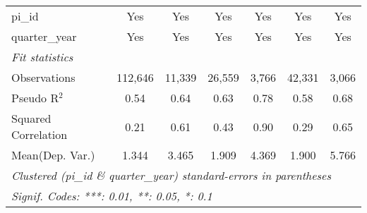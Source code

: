 \begin{tabular}{lcccccc}
   pi\_id                                                     & Yes           & Yes           & Yes            & Yes           & Yes           & Yes\\  
   quarter\_year                                              & Yes           & Yes           & Yes            & Yes           & Yes           & Yes\\  
   \midrule
   \emph{Fit statistics}\\
   Observations                                               & 112,646       & 11,339        & 26,559         & 3,766         & 42,331        & 3,066\\  
   Pseudo R$^2$                                               & 0.54          & 0.64          & 0.63           & 0.78          & 0.58          & 0.68\\  
   Squared Correlation                                        & 0.21          & 0.61          & 0.43           & 0.90          & 0.29          & 0.65\\  
Mean(Dep. Var.) & 1.344 & 3.465 & 1.909 & 4.369 & 1.900 & 5.766 \\
   \midrule \midrule
   \multicolumn{7}{l}{\emph{Clustered (pi\_id \& quarter\_year) standard-errors in parentheses}}\\
   \multicolumn{7}{l}{\emph{Signif. Codes: ***: 0.01, **: 0.05, *: 0.1}}\\
\end{tabular}
\par\endgroup
